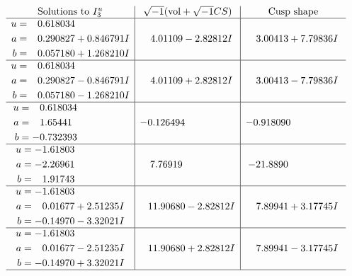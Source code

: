 \documentclass[1p]{elsarticle_modified}
\theoremstyle{definition}
\newcommand{\I}{\sqrt{-1}}
\begin{document}
$$\begin{array}{c|c|c}  
\text{Solutions to }I^u_{3}& \I (\text{vol} + \sqrt{-1}CS) & \text{Cusp shape}\\
 \hline 
\begin{aligned}
u &= \phantom{-}0.618034\phantom{ +0.000000I} \\
a &= \phantom{-}0.290827 + 0.846791 I \\
b &= \phantom{-}0.057180 + 1.268210 I\end{aligned}
 & \phantom{-}4.01109 - 2.82812 I & \phantom{-}3.00413 + 7.79836 I \\ \hline\begin{aligned}
u &= \phantom{-}0.618034\phantom{ +0.000000I} \\
a &= \phantom{-}0.290827 - 0.846791 I \\
b &= \phantom{-}0.057180 - 1.268210 I\end{aligned}
 & \phantom{-}4.01109 + 2.82812 I & \phantom{-}3.00413 - 7.79836 I \\ \hline\begin{aligned}
u &= \phantom{-}0.618034\phantom{ +0.000000I} \\
a &= \phantom{-}1.65441\phantom{ +0.000000I} \\
b &= -0.732393\phantom{ +0.000000I}\end{aligned}
 & -0.126494\phantom{ +0.000000I} & -0.918090\phantom{ +0.000000I} \\ \hline\begin{aligned}
u &= -1.61803\phantom{ +0.000000I} \\
a &= -2.26961\phantom{ +0.000000I} \\
b &= \phantom{-}1.91743\phantom{ +0.000000I}\end{aligned}
 & \phantom{-}7.76919\phantom{ +0.000000I} & -21.8890\phantom{ +0.000000I} \\ \hline\begin{aligned}
u &= -1.61803\phantom{ +0.000000I} \\
a &= \phantom{-}0.01677 + 2.51235 I \\
b &= -0.14970 - 3.32021 I\end{aligned}
 & \phantom{-}11.90680 - 2.82812 I & \phantom{-}7.89941 + 3.17745 I \\ \hline\begin{aligned}
u &= -1.61803\phantom{ +0.000000I} \\
a &= \phantom{-}0.01677 - 2.51235 I \\
b &= -0.14970 + 3.32021 I\end{aligned}
 & \phantom{-}11.90680 + 2.82812 I & \phantom{-}7.89941 - 3.17745 I\\
 \hline 
 \end{array}$$\newpage
\end{document}
